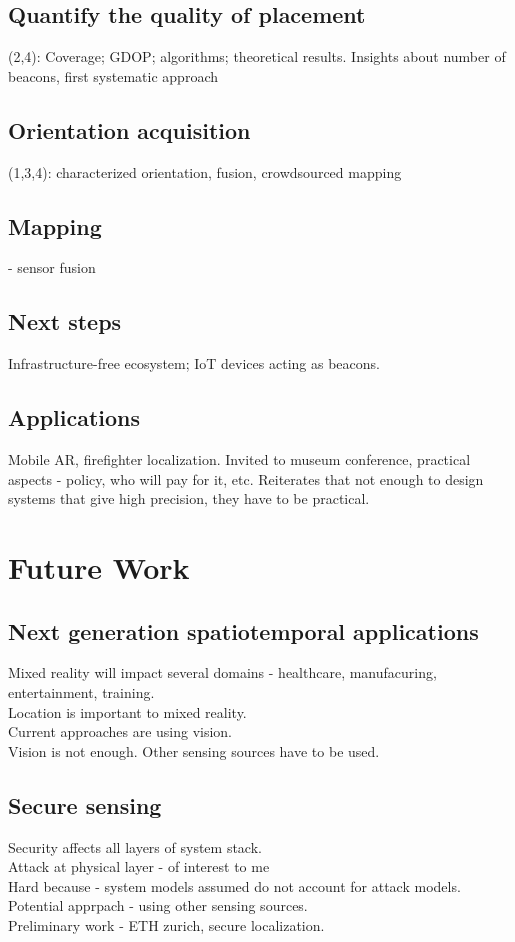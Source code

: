 \documentclass[10pt]{article}
\begin{document}
\subsection{Quantify the quality of placement}
(2,4): Coverage; GDOP; algorithms; theoretical results.
Insights about number of beacons, first systematic approach

\subsection{Orientation acquisition}
(1,3,4): characterized orientation, fusion, crowdsourced mapping

\subsection{Mapping}
 - sensor fusion

\subsection{Next steps}
Infrastructure-free ecosystem; IoT devices acting as beacons.


\subsection{Applications} 
Mobile AR, firefighter localization. Invited to museum conference, practical aspects - policy, who will pay for it, etc. 
Reiterates that not enough to design systems that give high precision, they have to be practical. 

\section{Future Work}
\subsection{Next generation spatiotemporal applications}
Mixed reality will impact several domains - healthcare, manufacuring, entertainment, training.\\
Location is important to mixed reality.\\
Current approaches are using vision.\\
Vision is not enough. Other sensing sources have to be used.

\subsection{Secure sensing}
Security affects all layers of system stack.\\
Attack at physical layer  - of interest to me\\
Hard because - system models assumed do not account for attack models.\\
Potential apprpach - using other sensing sources.\\
Preliminary work - ETH zurich, secure localization.
\end{document}
